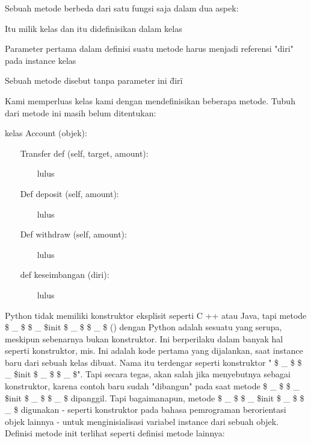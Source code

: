 \begin{12pt}
\begin{12pt}
\begin{12pt}
\begin{12pt}
\begin{12pt}
\begin{12pt}
\begin{12pt}
\begin{12pt}
\begin{12pt}
\begin{12pt}
\begin{12pt}
\begin{12pt}
\begin{12pt}
\begin{12pt}
\begin{12pt}
\begin{12pt}
\begin{12pt}
\begin{12pt}
\begin{12pt}
\noindent 
Sebuah metode berbeda dari satu fungsi saja dalam dua aspek: \par
\noindent 
Itu milik kelas dan itu didefinisikan dalam kelas \par
\noindent 
Parameter pertama dalam definisi suatu metode harus menjadi referensi "diri" pada instance kelas \par
\noindent 
Sebuah metode disebut tanpa parameter ini \"diri\" \par
\vspace{12pt}
Kami memperluas kelas kami dengan mendefinisikan beberapa metode. Tubuh dari metode ini masih belum ditentukan: \par
\vspace{12pt}
\noindent 
kelas Account (objek): \par
\vspace{12pt}
\noindent 
~~~ Transfer def (self, target, amount): \par
\noindent 
~~~~~~~ lulus \par
\noindent 
  \par
\noindent 
~~~ Def deposit (self, amount): \par
\noindent 
~~~~~~~ lulus \par
\noindent 
  \par
\noindent 
~~~ Def withdraw (self, amount): \par
\noindent 
~~~~~~~ lulus \par
\noindent 
  \par
\noindent 
~~~ def keseimbangan (diri): \par
\noindent 
~~~~~~~ lulus \par
\vspace{12pt}
\noindent 
Python tidak memiliki konstruktor eksplisit seperti C ++ atau Java, tapi metode  \$  \_  \$ \$  \_  \$init  \$  \_  \$ \$  \_  \$ () dengan Python adalah sesuatu yang serupa, meskipun sebenarnya bukan konstruktor. Ini berperilaku dalam banyak hal seperti konstruktor, mis. Ini adalah kode pertama yang dijalankan, saat instance baru dari sebuah kelas dibuat. Nama itu terdengar seperti konstruktor " \$  \_  \$ \$  \_  \$init \$  \_  \$ \$  \_  \$". Tapi secara tegas, akan salah jika menyebutnya sebagai konstruktor, karena contoh baru sudah "dibangun" pada saat metode  \$  \_  \$ \$  \_  \$init \$  \_  \$ \$  \_  \$ dipanggil. Tapi bagaimanapun, metode  \$  \_  \$ \$  \_  \$init \$  \_  \$ \$  \_  \$ digunakan - seperti konstruktor pada bahasa pemrograman berorientasi objek lainnya - untuk menginisialisasi variabel instance dari sebuah objek. Definisi metode init terlihat seperti definisi metode lainnya: \par

\end{12pt}
\end{12pt}
\end{12pt}
\end{12pt}
\end{12pt}
\end{12pt}
\end{12pt}
\end{12pt}
\end{12pt}
\end{12pt}
\end{12pt}
\end{12pt}
\end{12pt}
\end{12pt}
\end{12pt}
\end{12pt}
\end{12pt}
\end{12pt}
\end{12pt}
